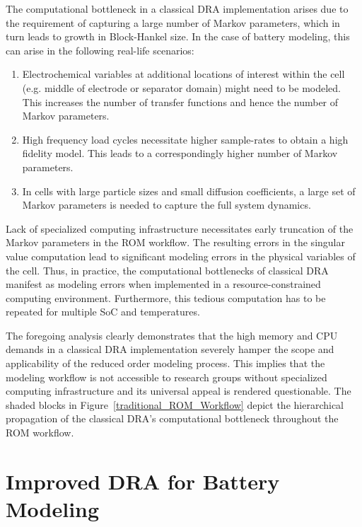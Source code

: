 The computational bottleneck in a classical DRA implementation arises
due to the requirement of capturing a large number of Markov parameters,
which in turn leads to growth in Block-Hankel size. In the case of
battery modeling, this can arise in the following real-life scenarios:
\begin{enumerate}
	\item Electrochemical variables at additional locations of interest within
	the cell (e.g. middle of electrode or separator domain) might need
	to be modeled. This increases the number of transfer functions and
	hence the number of Markov parameters.
	\item High frequency load cycles necessitate higher sample-rates to obtain
	a high fidelity model. This leads to a correspondingly higher number
	of Markov parameters.
	\item In cells with large particle sizes and small diffusion coefficients,
	a large set of Markov parameters is needed to capture the full system
	dynamics.
\end{enumerate}
Lack of specialized computing infrastructure necessitates early truncation
of the Markov parameters in the ROM workflow. The resulting errors
in the singular value computation lead to significant modeling errors
in the physical variables of the cell. Thus, in practice, the computational
bottlenecks of classical DRA manifest as modeling errors when implemented
in a resource-constrained computing environment. Furthermore, this
tedious computation has to be repeated for multiple SoC and temperatures.

The foregoing analysis clearly demonstrates that the high memory and
CPU demands in a classical DRA implementation severely hamper the
scope and applicability of the reduced order modeling process. This
implies that the modeling workflow is not accessible to research groups
without specialized computing infrastructure and its universal appeal
is rendered questionable. The shaded blocks in Figure~\ref{traditional_ROM_Workflow}
depict the hierarchical propagation of the classical DRA's computational
bottleneck throughout the ROM workflow.

\section{Improved DRA for Battery Modeling \label{sec:Efficient-Computation-of}}

